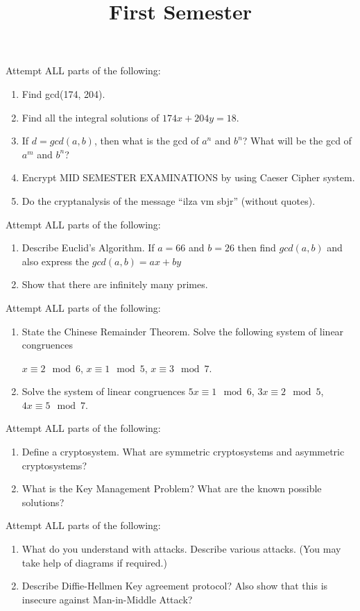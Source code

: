 \documentclass[11pt]{article}
\title{First Semester}
\begin{document}
 
\begin{questions}
\question Attempt ALL parts of the following: 
	\begin{enumerate}
	\item Find gcd(174, 204).
	\item Find all the integral solutions of $174x + 204y = 18$.
	\item If $d = gcd(a, b)$, then what is the gcd of $a^n$ and $b^n$? What will be the gcd of $a^m$ and $b^n$?
	\item Encrypt MID SEMESTER EXAMINATIONS by using Caeser Cipher system.
	\item Do the cryptanalysis of the message ``ilza vm sbjr'' (without quotes).
	
	\end{enumerate}
\vspace{-0.2cm}
\item Attempt ALL parts of the following: 
\begin{enumerate}
\item Describe Euclid's Algorithm. If $a = 66$ and $b = 26$ then find $gcd(a,b)$ and also express the $gcd(a,b)=ax+by$
\item Show that there are infinitely many primes.
\end{enumerate}
\vspace{-0.2cm}
\item Attempt ALL parts of the following: 
\begin{enumerate}
\item State the Chinese Remainder Theorem. Solve the following system of linear congruences 

$x \equiv 2 \mod 6$, $x \equiv 1 \mod 5$, $x\equiv 3 \mod 7$.
\item Solve the system of linear congruences $5x \equiv 1 \mod 6$, $3x \equiv 2 \mod 5$, $4x \equiv 5 \mod 7$.
\end{enumerate}
\vspace{-0.2cm}
\item Attempt ALL parts of the following: 
\begin{enumerate}
\item Define a cryptosystem. What are symmetric cryptosystems and  asymmetric  cryptosystems? 
\item What is the Key Management Problem? What are the known possible solutions?
\end{enumerate}
\vspace{-0.2cm}
\item Attempt ALL parts of the following: 
\begin{enumerate}
\item What do you understand with attacks. Describe various attacks. (You may take help of diagrams if required.)
\item Describe Diffie-Hellmen Key agreement protocol? Also show that this is insecure against Man-in-Middle Attack?
\end{enumerate}


\end{questions}
\end{document}
